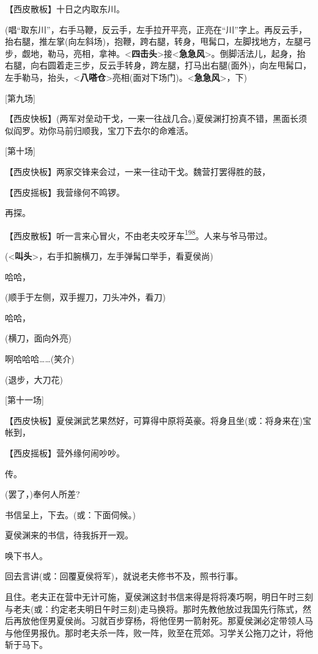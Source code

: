 【西皮散板】十日之内取东川。

(唱``取东川''，右手马鞭，反云手，左手拉开平亮，正亮在``川''字上。再反云手，抬右腿，推左掌(向左斜场)，抱鞭，跨右腿，转身，甩髯口，左脚找地方，左腿弓步，觑地，勒马，亮相，拿神。\textless{}\textbf{四击头}\textgreater{}接\textless{}\textbf{急急风}\textgreater{}。倒脚活法儿，起身，抬右腿，向右圆着走三步，反云手转身，跨左腿，打马出右腿(面外)，向左甩髯口，左手勒马，抬头，\textless{}\textbf{八嗒仓}\textgreater{}亮相(面对下场门)。\textless{}\textbf{急急风}\textgreater{}，下)

{[}第九场{]}

【西皮快板】(两军对垒动干戈，一来一往战几合。)夏侯渊打扮真不错，黑面长须似阎罗。劝你马前归顺我，宝刀下去尔的命难活。

{[}第十场{]}

【西皮快板】两家交锋来会过，一来一往动干戈。魏营打罢得胜的鼓，

【西皮摇板】我营缘何不鸣锣。

再探。

【西皮散板】听一言来心冒火，不由老夫咬牙车\protect\hyperlink{fn198}{\textsuperscript{198}}。人来与爷马带过。

(\textless{}\textbf{叫头}\textgreater{}，右手扣腕横刀，左手弹髯口举手，看夏侯尚)

哈哈，

(顺手于左侧，双手握刀，刀头冲外，看刀)

哈哈，

(横刀，面向外亮)

啊哈哈哈\ldots{}\ldots{}(笑介)

(退步，大刀花)

{[}第十一场{]}

【西皮快板】夏侯渊武艺果然好，可算得中原将英豪。将身且坐(或：将身来在)宝帐到，

【西皮摇板】营外缘何闹吵吵。

传。

(罢了，)奉何人所差?

书信呈上，下去。(或：下面伺候。)

夏侯渊来的书信，待我拆开一观。

唤下书人。

回去言讲(或：回覆夏侯将军)，就说老夫修书不及，照书行事。

且住。老夫正在营中无计可施，夏侯渊这封书信来得是将将凑巧啊，明日午时三刻与老夫(或：约定老夫明日午时三刻)走马换将。那时先教他放过我国先行陈式，然后再放他侄男夏侯尚。习就百步穿杨，将他侄男一箭射死。那夏侯渊必定带领人马与他侄男报仇。那时老夫杀一阵，败一阵，败至在荒郊。习学关公拖刀之计，将他斩于马下。

